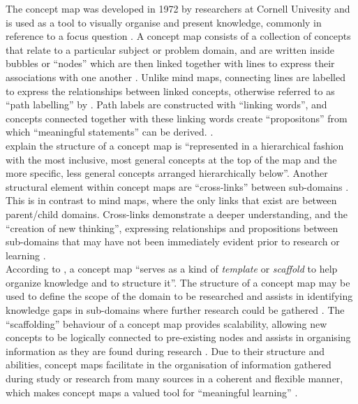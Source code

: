 \documentclass[12pt,a4paper]{report}
\begin{document}
The concept map was developed in 1972 by researchers at Cornell Univesity and is used as a tool to visually organise and present knowledge, commonly in reference to a focus question \citep{Novak2006}. A concept map consists of a collection of concepts that relate to a particular subject or problem domain, and are written inside bubbles or ``nodes'' which are then linked together with lines to express their associations with one another \citep{Novak2006}. Unlike mind maps, connecting lines are labelled to express the relationships between linked concepts, otherwise referred to as ``path labelling'' by \citet[p. 790]{Rodriguez-Priego2013}. Path labels are constructed with ``linking words'', and concepts connected together with these linking words create ``propositons'' from which ``meaningful statements'' can be derived. \citep[p. 1]{Novak2006}.\\

\citet[p. 1]{Novak2006} explain the structure of a concept map is ``represented in a hierarchical fashion with the most inclusive, most general concepts at the top of the map and the more specific, less general concepts arranged hierarchically below''. Another structural element within concept maps are ``cross-links'' between sub-domains \citep[p. 1]{Novak2006}. This is in contrast to mind maps, where the only links that exist are between parent/child domains. Cross-links demonstrate a deeper understanding, and the ``creation of new thinking'', expressing relationships and propositions between sub-domains that may have not been immediately evident prior to research or learning \citep[p. 1]{Novak2006}.\\

According to \citet[p. 1]{Novak2006}, a concept map ``serves as a kind of \emph{template} or \emph{scaffold} to help organize knowledge and to structure it''. The structure of a concept map may be used to define the scope of the domain to be researched and assists in identifying knowledge gaps in sub-domains where further research could be gathered \citep{Novak2006}. The ``scaffolding'' behaviour of a concept map provides scalability, allowing new concepts to be logically connected to pre-existing nodes and assists in organising information as they are found during research \citep{Novak2006}. Due to their structure and abilities, concept maps facilitate in the organisation of information gathered during study or research from many sources in a coherent and flexible manner, which makes concept maps a valued tool for ``meaningful learning'' \citep[p. 1]{Novak2006}.
\end{document}
